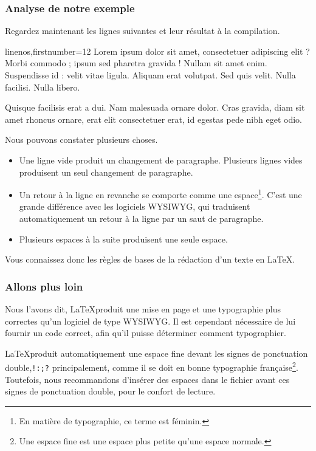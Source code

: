 \subsubsection{Analyse de notre exemple}
Regardez maintenant les lignes suivantes et leur résultat à la compilation.


\begin{latexcode*}{linenos,firstnumber=12}
Lorem ipsum dolor sit amet, consectetuer adipiscing elit ?
Morbi commodo ; ipsum sed pharetra gravida !
Nullam sit amet enim. Suspendisse id : velit vitae ligula.
Aliquam erat volutpat.
Sed quis velit. Nulla facilisi. Nulla libero. 

Quisque facilisis erat a dui.
Nam malesuada ornare dolor.
Cras gravida, diam sit amet rhoncus ornare, 
erat      elit consectetuer erat, id egestas pede nibh eget odio.
\end{latexcode*}


Nous pouvons constater plusieurs choses.
\begin{itemize}
\item Une ligne vide produit un changement de paragraphe. Plusieurs lignes vides produisent un seul changement de paragraphe.
\item Un retour à la ligne en revanche se comporte comme une espace\footnote{En matière de typographie, ce terme est féminin.}. C'est une grande différence avec les logiciels WYSIWYG, qui traduisent automatiquement un retour à la ligne  par un saut de paragraphe.
\item Plusieurs espaces à la suite produisent une seule espace. 
\end{itemize}

Vous connaissez donc les règles de bases de la rédaction d'un texte en \LaTeX.

\subsubsection{Allons plus loin}


Nous l'avons dit, \LaTeX produit une mise en page et une typographie plus correctes qu'un logiciel de type WYSIWYG. Il est cependant nécessaire de lui fournir un code correct, afin qu'il puisse déterminer comment typographier.

\LaTeX produit automatiquement  une espace fine devant les signes de ponctuation double,\verb|!:;?| principalement, comme il se doit en bonne typographie fran\c caise\footnote{Une espace fine est une espace plus petite qu'une espace normale.}. Toutefois, nous recommandons d'insérer des espaces dans le fichier  avant ces signes de ponctuation double, pour le confort de lecture.

